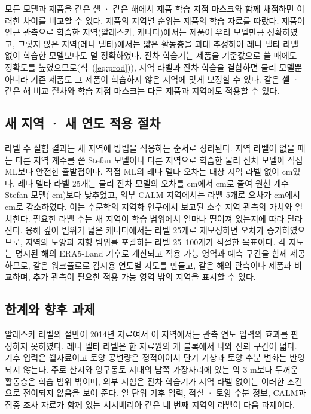 모든 모델과 제품을 같은 셀 · 같은 해에서 제품 학습 지점 마스크와 함께 채점하면 이러한 차이를 비교할 수 있다. 제품의 지역별 순위는 제품의 학습 자료를 따랐다. 제품이 인근 관측으로 학습한 지역(알래스카, 캐나다)에서는 제품이 우리 모델만큼 정확하였고, 그렇지 않은 지역(레나 델타)에서는 얇은 활동층을 과대 추정하여 레나 델타 라벨 없이 학습한 모델보다도 덜 정확하였다. 잔차 학습기는 제품을 기준값으로 쓸 때에도 정확도를 높였으므로(식~(\ref{eq:prod})), 지역 라벨과 잔차 학습을 결합하면 물리 모델뿐 아니라 기존 제품도 그 제품이 학습하지 않은 지역에 맞게 보정할 수 있다. 같은 셀 · 같은 해 비교 절차와 학습 지점 마스크는 다른 제품과 지역에도 적용할 수 있다.

\subsection{새 지역 · 새 연도 적용 절차}
라벨 수 실험 결과는 새 지역에 방법을 적용하는 순서로 정리된다. 지역 라벨이 없을 때는 다른 지역 계수를 쓴 Stefan 모델이나 다른 지역으로 학습한 물리 잔차 모델이 직접 ML보다 안전한 출발점이다. 직접 ML의 레나 델타 오차는 대상 지역 라벨 없이 \ntlrmseLeDszero{} cm였다. 레나 델타 라벨 25개는 물리 잔차 모델의 오차를 \ntlrmseLeRszero{} cm에서 \ntlrmseLeRstwfive{} cm로 줄여 원천 계수 Stefan 모델(\ntlrmseLePzzero{} cm)보다 낮추었고, 외부 CALM 지역에서는 라벨 5개로 오차가 \nftAllRszero{} cm에서 \nftAllRsfive{} cm로 감소하였다. 이는 수문학의 지역화 연구에서 보고된 소수 지역 관측의 가치와 일치한다\cite{Pool2019}. 필요한 라벨 수는 새 지역이 학습 범위에서 얼마나 떨어져 있는지에 따라 달라진다. 융해 깊이 범위가 넓은 캐나다에서는 라벨 25개로 재보정하면 오차가 증가하였으므로, 지역의 토양과 지형 범위를 포괄하는 라벨 25--100개가 적절한 목표이다. 각 지도는 명시된 해의 ERA5-Land 기후로 계산되고 적용 가능 영역과 예측 구간을 함께 제공하므로, 같은 워크플로로 감시용 연도별 지도를 만들고, 같은 해의 관측이나 제품과 비교하며, 추가 관측이 필요한 적용 가능 영역 밖의 지역을 표시할 수 있다.

\subsection{한계와 향후 과제}
알래스카 라벨의 절반이 2014년 자료여서 이 지역에서는 관측 연도 입력의 효과를 판정하지 못하였다. 레나 델타 라벨은 한 자료원의 \nnblkLe{}개 블록에서 나와 신뢰 구간이 넓다. 기후 입력은 월자료이고 토양 공변량은 정적이어서 단기 기상과 토양 수분 변화는 반영되지 않는다. 주로 산지와 영구동토 지대의 남쪽 가장자리에 있는 약 3 m보다 두꺼운 활동층은 학습 범위 밖이며, 외부 시험은 잔차 학습기가 지역 라벨 없이는 이러한 조건으로 전이되지 않음을 보여 준다. 일 단위 기후 입력, 적설 · 토양 수분 정보, CALM과 집중 조사 자료가 함께 있는 서시베리아 같은 네 번째 지역의 라벨이 다음 과제이다.
